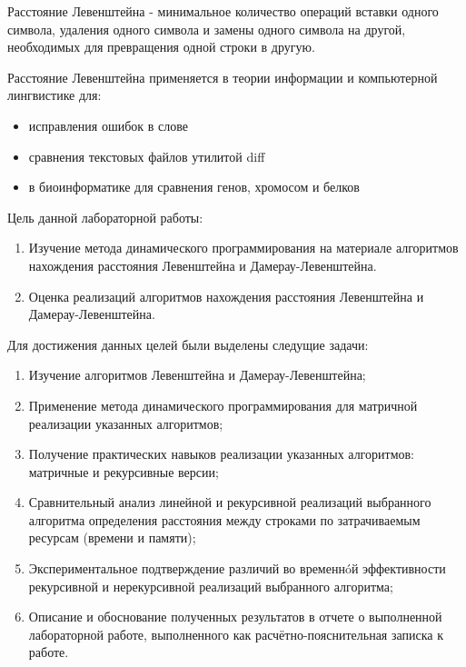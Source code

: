 \Introduction

\setcounter{page}{2}

Расстояние Левенштейна - минимальное количество операций вставки одного символа, удаления одного символа и замены одного символа на другой, необходимых для превращения одной строки в другую.
\newline

Расстояние Левенштейна применяется в теории информации и компьютерной лингвистике для:
\begin{itemize}
	\item исправления ошибок в слове
	\item сравнения текстовых файлов утилитой diff
	\item в биоинформатике для сравнения генов, хромосом и белков
\end{itemize}

Цель данной лабораторной работы: 
\begin{enumerate}
	\item Изучение метода динамического программирования на материале алгоритмов нахождения расстояния Левенштейна и Дамерау-Левенштейна.
	\item Оценка реализаций алгоритмов нахождения расстояния Левенштейна и Дамерау-Левенштейна.
\end{enumerate}

Для достижения данных целей были выделены следущие задачи:
\begin{enumerate}
  	\item Изучение алгоритмов Левенштейна и Дамерау-Левенштейна;
	\item Применение метода динамического программирования для матричной реализации указанных алгоритмов; 
	\item Получение практических навыков реализации указанных алгоритмов: матричные и рекурсивные версии; 
	\item Сравнительный анализ линейной и рекурсивной реализаций выбранного алгоритма определения расстояния между строками по затрачиваемым ресурсам (времени и памяти); 
	\item Экспериментальное подтверждение различий во временнóй эффективности рекурсивной и
нерекурсивной реализаций выбранного алгоритма; 
	\item Описание и обоснование полученных результатов в отчете о выполненной лабораторной
работе, выполненного как расчётно-пояснительная записка к работе. 
\end{enumerate}

